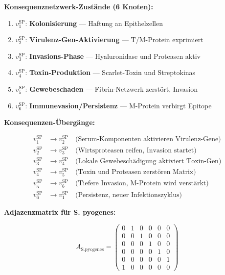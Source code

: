 \documentclass[a4paper,12pt]{article}
\theoremstyle{definition}
\begin{document}
\textbf{Konsequenznetzwerk-Zustände (6 Knoten):}

\begin{enumerate}
    \item $v_1^{\text{SP}}$: \textbf{Kolonisierung} --- Haftung an Epithelzellen
    \item $v_2^{\text{SP}}$: \textbf{Virulenz-Gen-Aktivierung} --- T/M-Protein exprimiert
    \item $v_3^{\text{SP}}$: \textbf{Invasions-Phase} --- Hyaluronidase und Proteasen aktiv
    \item $v_4^{\text{SP}}$: \textbf{Toxin-Produktion} --- Scarlet-Toxin und Streptokinas
    \item $v_5^{\text{SP}}$: \textbf{Gewebeschaden} --- Fibrin-Netzwerk zerstört, Invasion
    \item $v_6^{\text{SP}}$: \textbf{Immunevasion/Persistenz} --- M-Protein verbirgt Epitope
\end{enumerate}

\textbf{Konsequenzen-Übergänge:}

\begin{align*}
v_1^{\text{SP}} &\to v_2^{\text{SP}} \quad \text{(Serum-Komponenten aktivieren Virulenz-Gene)} \\
v_2^{\text{SP}} &\to v_3^{\text{SP}} \quad \text{(Wirtsproteasen reifen, Invasion startet)} \\
v_3^{\text{SP}} &\to v_4^{\text{SP}} \quad \text{(Lokale Gewebeschädigung aktiviert Toxin-Gen)} \\
v_4^{\text{SP}} &\to v_5^{\text{SP}} \quad \text{(Toxin und Proteasen zerstören Matrix)} \\
v_5^{\text{SP}} &\to v_6^{\text{SP}} \quad \text{(Tiefere Invasion, M-Protein wird verstärkt)} \\
v_6^{\text{SP}} &\to v_1^{\text{SP}} \quad \text{(Persistenz, neuer Infektionszyklus)}
\end{align*}

\textbf{Adjazenzmatrix für S. pyogenes:}

\[
A_{\text{S.pyogenes}} = \begin{pmatrix}
0 & 1 & 0 & 0 & 0 & 0 \\
0 & 0 & 1 & 0 & 0 & 0 \\
0 & 0 & 0 & 1 & 0 & 0 \\
0 & 0 & 0 & 0 & 1 & 0 \\
0 & 0 & 0 & 0 & 0 & 1 \\
1 & 0 & 0 & 0 & 0 & 0
\end{pmatrix}
\]
\end{document}

